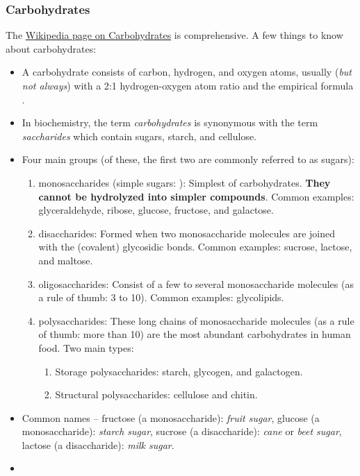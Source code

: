 \documentclass[12pt]{article}
\begin{document}
\subsubsection{Carbohydrates}
The \href{https://en.wikipedia.org/wiki/Carbohydrate}{Wikipedia page on Carbohydrates} is comprehensive. A few things to know about carbohydrates:
\begin{itemize}
    \item A carbohydrate consists of carbon, hydrogen, and oxygen atoms, usually (\emph{but not always}) with a 2:1 hydrogen-oxygen atom ratio and the empirical formula .
    \item In biochemistry, the term \emph{carbohydrates} is synonymous with the term \emph{saccharides} which contain sugars, starch, and cellulose. 
    \item Four main groups (of these, the first two are commonly referred to as sugars): 
        \begin{enumerate}
            \item monosaccharides (simple sugars: ): Simplest of carbohydrates. \textbf{They cannot be hydrolyzed into simpler compounds}. Common examples: glyceraldehyde, ribose, glucose, fructose, and galactose.
            \item disaccharides: Formed when two monosaccharide molecules are joined with the (covalent) glycosidic bonds. Common examples: sucrose, lactose, and maltose.
            \item oligosaccharides: Consist of a few to several monosaccharide molecules (as a rule of thumb: 3 to 10). Common examples: glycolipids.
            \item polysaccharides: These long chains of monosaccharide molecules (as a rule of thumb: more than 10) are the most abundant carbohydrates in human food. Two main types:
            \begin{enumerate}
                \item Storage polysaccharides: starch, glycogen, and galactogen.
                \item Structural polysaccharides: cellulose and chitin.
            \end{enumerate}
        \end{enumerate}
    \item Common names -- fructose (a monosaccharide): \emph{fruit sugar}, glucose (a monosaccharide): \emph{starch sugar}, sucrose (a disaccharide): \emph{cane} or \emph{beet sugar}, lactose (a disaccharide): \emph{milk sugar}.
    \item 
\end{itemize}
\end{document}
